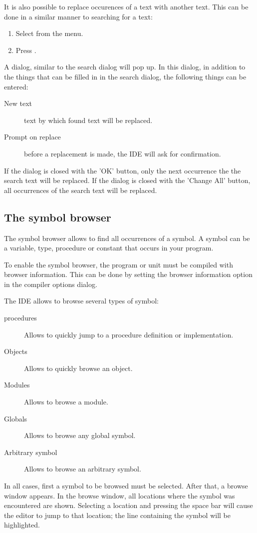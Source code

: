 It is also possible to replace occurences of a text with another text. 
This can be done in a similar manner to searching for a text:
\begin{enumerate}
\item Select  from the menu.
\item Press .
\end{enumerate}
A dialog, similar to the search dialog will pop up.
In this dialog, in addition to the things that can be filled in in the
search dialog, the following things can be entered:
\begin{description}
\item [New text] text by which found text will be replaced.
\item [Prompt on replace] before a replacement is made, the IDE will ask for
confirmation.
\end{description}
If the dialog is closed with the 'OK' button, only the next occurrence the
the search text will be replaced. 
If the dialog is closed with the 'Change All' button, all occurrences of 
the search text will be replaced.

\subsection{The symbol browser}
\label{se:browser}
The symbol browser allows to find all occurrences of a symbol. A symbol 
can be a variable, type, procedure or constant that occurs in your program.

To enable the symbol browser, the program or unit must be compiled with
browser information. This can be done by setting the browser information
option in the compiler options dialog.

The IDE allows to browse several types of symbol:
\begin{description}
\item[procedures] Allows to quickly jump to a procedure definition or
implementation.
\item[Objects] Allows to quickly browse an object.
\item[Modules] Allows to browse a module.
\item[Globals] Allows to browse any global symbol.
\item[Arbitrary symbol] Allows to browse an arbitrary symbol.
\end{description}
In all cases, first a symbol to be browsed must be selected. After that,
a browse window appears. In the browse window, all locations where the 
symbol was encountered are shown. Selecting a location and pressing the
space bar will cause the editor to jump to that location; the line
containing the symbol will be highlighted. 

